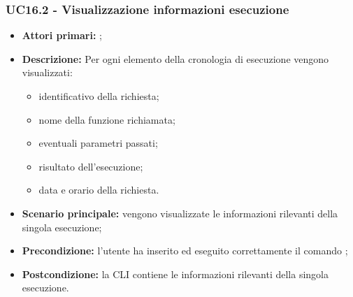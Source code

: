 \subsubsection{UC16.2 - Visualizzazione informazioni esecuzione}
\begin{itemize}
	\item \textbf{Attori primari:} \us{};
	\item \textbf{Descrizione:} Per ogni elemento della cronologia di esecuzione vengono visualizzati:
	\begin{itemize}
		\item identificativo della richiesta; 
		\item nome della funzione richiamata; 
		\item eventuali parametri passati; 
		\item risultato dell’esecuzione; 
		\item data e orario della richiesta. 
	\end{itemize}
	\item \textbf{Scenario principale:} vengono visualizzate le informazioni rilevanti della singola esecuzione;
	\item \textbf{Precondizione:} l’utente ha inserito ed eseguito correttamente il comando \history{}; 
	\item \textbf{Postcondizione:} la CLI contiene le informazioni rilevanti della singola esecuzione.
\end{itemize}